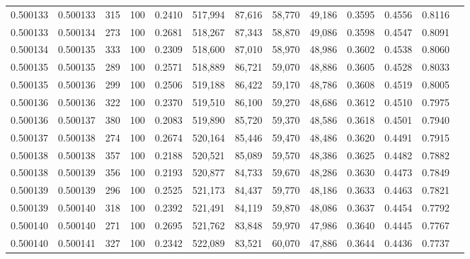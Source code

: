 \begin{tabular}{rrrrrrrrrrrrr}
0.500133 & 0.500133 &   315 & 100 &                                     0.2410 & 517,994 &  87,616 &  58,770 &  49,186 & 0.3595 & 0.4556 & 0.8116 \\
0.500133 & 0.500134 &   273 & 100 &                                     0.2681 & 518,267 &  87,343 &  58,870 &  49,086 & 0.3598 & 0.4547 & 0.8091 \\
0.500134 & 0.500135 &   333 & 100 &                                     0.2309 & 518,600 &  87,010 &  58,970 &  48,986 & 0.3602 & 0.4538 & 0.8060 \\
0.500135 & 0.500135 &   289 & 100 &                                     0.2571 & 518,889 &  86,721 &  59,070 &  48,886 & 0.3605 & 0.4528 & 0.8033 \\
0.500135 & 0.500136 &   299 & 100 &                                     0.2506 & 519,188 &  86,422 &  59,170 &  48,786 & 0.3608 & 0.4519 & 0.8005 \\
0.500136 & 0.500136 &   322 & 100 &                                     0.2370 & 519,510 &  86,100 &  59,270 &  48,686 & 0.3612 & 0.4510 & 0.7975 \\
0.500136 & 0.500137 &   380 & 100 &                                     0.2083 & 519,890 &  85,720 &  59,370 &  48,586 & 0.3618 & 0.4501 & 0.7940 \\
0.500137 & 0.500138 &   274 & 100 &                                     0.2674 & 520,164 &  85,446 &  59,470 &  48,486 & 0.3620 & 0.4491 & 0.7915 \\
0.500138 & 0.500138 &   357 & 100 &                                     0.2188 & 520,521 &  85,089 &  59,570 &  48,386 & 0.3625 & 0.4482 & 0.7882 \\
0.500138 & 0.500139 &   356 & 100 &                                     0.2193 & 520,877 &  84,733 &  59,670 &  48,286 & 0.3630 & 0.4473 & 0.7849 \\
0.500139 & 0.500139 &   296 & 100 &                                     0.2525 & 521,173 &  84,437 &  59,770 &  48,186 & 0.3633 & 0.4463 & 0.7821 \\
0.500139 & 0.500140 &   318 & 100 &                                     0.2392 & 521,491 &  84,119 &  59,870 &  48,086 & 0.3637 & 0.4454 & 0.7792 \\
0.500140 & 0.500140 &   271 & 100 &                                     0.2695 & 521,762 &  83,848 &  59,970 &  47,986 & 0.3640 & 0.4445 & 0.7767 \\
0.500140 & 0.500141 &   327 & 100 &                                     0.2342 & 522,089 &  83,521 &  60,070 &  47,886 & 0.3644 & 0.4436 & 0.7737 \\

\end{tabular}
